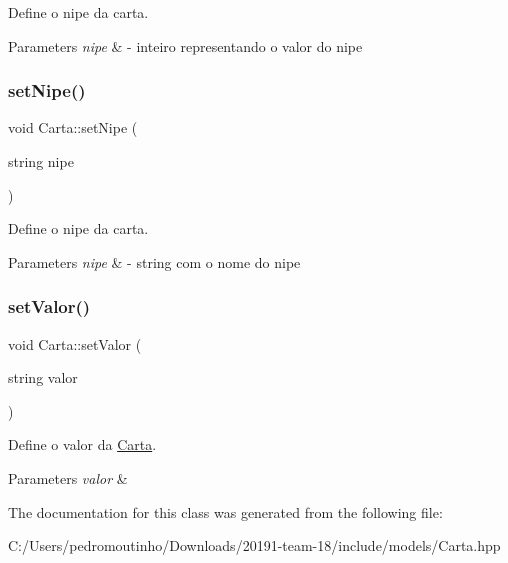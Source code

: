Define o nipe da carta. 


\begin{DoxyParams}{Parameters}
{\em nipe} & -\/ inteiro representando o valor do nipe \\
\hline
\end{DoxyParams}
\mbox{\label{class_carta_a770fd5ddbf8d3378a0179420ced840e0}} 
\subsubsection{\texorpdfstring{setNipe()}{setNipe()}\hspace{0.1cm}{\footnotesize\ttfamily [2/2]}}
{\footnotesize\ttfamily void Carta\+::set\+Nipe (\begin{DoxyParamCaption}\item[{string}]{nipe }\end{DoxyParamCaption})}



Define o nipe da carta. 


\begin{DoxyParams}{Parameters}
{\em nipe} & -\/ string com o nome do nipe \\
\hline
\end{DoxyParams}
\mbox{\label{class_carta_a66b728786354a62104ef2475b5376fea}} 
\subsubsection{\texorpdfstring{setValor()}{setValor()}}
{\footnotesize\ttfamily void Carta\+::set\+Valor (\begin{DoxyParamCaption}\item[{string}]{valor }\end{DoxyParamCaption})}



Define o valor da \mbox{\hyperlink{class_carta}{Carta}}. 


\begin{DoxyParams}{Parameters}
{\em valor} & \\
\hline
\end{DoxyParams}


The documentation for this class was generated from the following file\+:\begin{DoxyCompactItemize}
\item 
C\+:/\+Users/pedromoutinho/\+Downloads/20191-\/team-\/18/include/models/Carta.\+hpp\end{DoxyCompactItemize}
